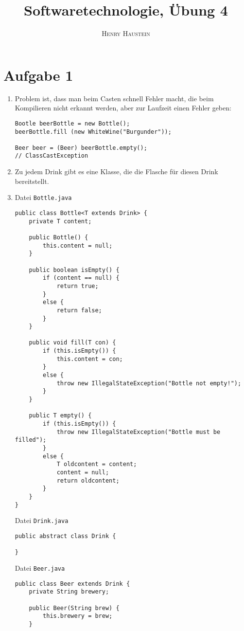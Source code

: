 \documentclass{article}
\title{\textbf{Softwaretechnologie, Übung 4}}
\author{\textsc{Henry Haustein}}
\date{}
\begin{document}
	\maketitle
	
	\section*{Aufgabe 1}
	\begin{enumerate}[label=(\alph*)]
		\item Problem ist, dass man beim Casten schnell Fehler macht, die beim Kompilieren nicht erkannt werden, aber zur Laufzeit einen Fehler geben:
		\begin{lstlisting}[style=java, tabsize=2]
Bootle beerBottle = new Bottle();
beerBottle.fill (new WhiteWine("Burgunder"));

Beer beer = (Beer) beerBottle.empty();
// ClassCastException
		\end{lstlisting}
		\item Zu jedem Drink gibt es eine Klasse, die die Flasche für diesen Drink bereitstellt.
		\item Datei \texttt{Bottle.java}
		\begin{lstlisting}[style=java,tabsize=2]
public class Bottle<T extends Drink> {
	private T content;
		
	public Bottle() {
		this.content = null;
	}
		
	public boolean isEmpty() {
		if (content == null) {
			return true;
		}
		else {
			return false;
		}
	}
		
	public void fill(T con) {
		if (this.isEmpty()) {
			this.content = con;
		}
		else {
			throw new IllegalStateException("Bottle not empty!");
		}
	}
		
	public T empty() {
		if (this.isEmpty()) {
			throw new IllegalStateException("Bottle must be filled");
		}
		else {
			T oldcontent = content;
			content = null;
			return oldcontent;   
		}
	}
}
		\end{lstlisting}
		Datei \texttt{Drink.java}
		\begin{lstlisting}[style=java, tabsize=2]
public abstract class Drink {
		
}
		\end{lstlisting}
		Datei \texttt{Beer.java}
		\begin{lstlisting}[style=java, tabsize=2]
public class Beer extends Drink {
	private String brewery;
		
	public Beer(String brew) {
		this.brewery = brew;
	}
		

\end{lstlisting}
\end{enumerate}
\end{document}
